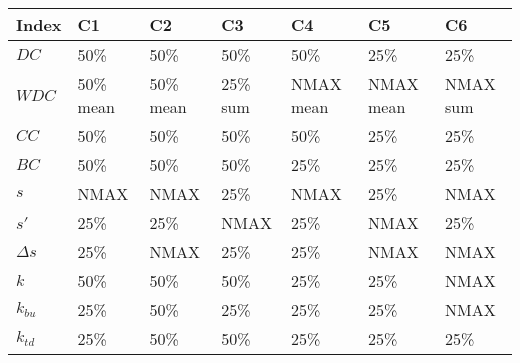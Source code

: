 \begin{table}[ht]
\centering
\begin{tabular}{lllllll}
  \hline
Index & C1 & C2 & C3 & C4 & C5 & C6 \\ 
  \hline
\(\displaystyle DC \) & {\color[HTML]{00D768} 50\% } & {\color[HTML]{EF2A00} 50\% } & {\color[HTML]{0051D7} 50\% } & {\color[HTML]{6200D7} 50\% } & {\color{orange} 25\% } & {\color[HTML]{9B9B9B} 25\% } \\ 
\(\displaystyle WDC \) &   {\color[HTML]{EF2A00} 50\% mean} & {\color[HTML]{00D768} 50\% mean} & {\color[HTML]{0051D7} 25\% sum} & {\color{orange} NMAX mean} & {\color[HTML]{6200D7} NMAX mean} & {\color[HTML]{9B9B9B} NMAX sum} \\ 
\(\displaystyle CC \) &   {\color[HTML]{00D768} 50\% } & {\color[HTML]{EF2A00} 50\% } & {\color[HTML]{0051D7} 50\% } & {\color[HTML]{6200D7} 50\% } & {\color{orange} 25\% } & {\color[HTML]{9B9B9B} 25\% } \\ 
\(\displaystyle BC \) &   {\color[HTML]{00D768} 50\% } & {\color[HTML]{0051D7} 50\% } & {\color[HTML]{EF2A00} 50\% } & {\color{orange} 25\% } & {\color[HTML]{6200D7} 25\% } & {\color[HTML]{9B9B9B} 25\% } \\ 
\(\displaystyle s \) &   {\color[HTML]{00D768} NMAX } & {\color[HTML]{EF2A00} NMAX } & {\color[HTML]{0051D7} 25\% } & {\color{orange} NMAX } & {\color[HTML]{6200D7} 25\% } & {\color[HTML]{9B9B9B} NMAX } \\ 
\(\displaystyle s' \) &   {\color[HTML]{EF2A00} 25\% } & {\color[HTML]{0051D7} 25\% } & {\color[HTML]{00D768} NMAX } & {\color[HTML]{6200D7} 25\% } & {\color{orange} NMAX } & {\color[HTML]{9B9B9B} 25\% } \\ 
\(\displaystyle \Delta s \) &   {\color[HTML]{00D768} 25\% } & {\color[HTML]{EF2A00} NMAX } & {\color[HTML]{0051D7} 25\% } & {\color[HTML]{6200D7} 25\% } & {\color{orange} NMAX } & {\color[HTML]{9B9B9B} NMAX } \\ 
\(\displaystyle k \) &   {\color[HTML]{00D768} 50\% } & {\color[HTML]{EF2A00} 50\% } & {\color[HTML]{0051D7} 50\% } & {\color[HTML]{6200D7} 25\% } & {\color{orange} 25\% } & {\color[HTML]{9B9B9B} NMAX } \\ 
\(\displaystyle k_{bu} \) &   {\color[HTML]{00D768} 25\% } & {\color[HTML]{EF2A00} 50\% } & {\color[HTML]{0051D7} 25\% } & {\color[HTML]{6200D7} 25\% } & {\color{orange} 25\% } & {\color[HTML]{9B9B9B} NMAX } \\ 
\(\displaystyle k_{td} \) &   {\color[HTML]{EF2A00} 25\% } & {\color[HTML]{00D768} 50\% } & {\color[HTML]{0051D7} 50\% } & {\color[HTML]{6200D7} 25\% } & {\color{orange} 25\% } & {\color[HTML]{9B9B9B} 25\% } \\ 

\end{tabular}
\end{table}
